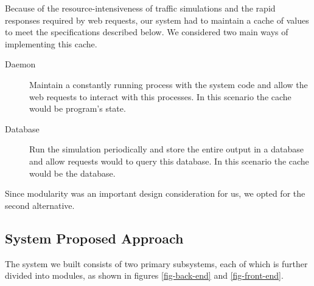 
Because of the resource-intensiveness of traffic simulations and the
rapid responses required by web requests, our system had to maintain a
cache of values to meet the specifications described below. We
considered two main ways of implementing this cache.

\begin{description}
    \item[Daemon] Maintain a constantly running process with the
  system code and allow the web requests to interact with this
  processes. In this scenario the cache would be program's state.
    \item[Database] Run the simulation periodically and store the
  entire output in a database and allow requests would to query this
  database. In this scenario the cache would be the database.
\end{description}

Since modularity was an important design consideration for us, we
opted for the second alternative.

\subsection{System Proposed Approach}

The system we built consists of two primary subsystems, each of which
is further divided into modules, as shown in figures
\ref{fig-back-end} and \ref{fig-front-end}.

